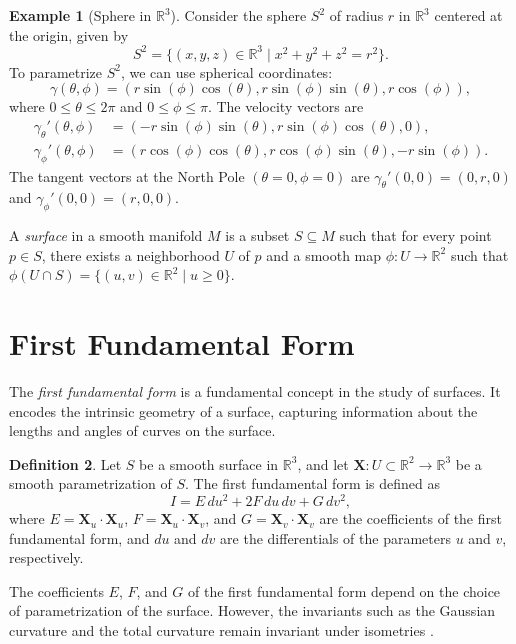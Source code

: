 \documentclass{article}
\theoremstyle{definition}
\newtheorem{definition}{Definition}[section]
\newtheorem{example}[definition]{Example}
\numberwithin{equation}{section}
\begin{document}
\begin{example}[Sphere in $\mathbb{R}^3$]
Consider the sphere $S^2$ of radius $r$ in $\mathbb{R}^3$ centered at the origin, given by
\[S^2 = \{(x, y, z) \in \mathbb{R}^3 \mid x^2 + y^2 + z^2 = r^2\}.\]
To parametrize $S^2$, we can use spherical coordinates:
\[\gamma(\theta, \phi) = (r\sin(\phi)\cos(\theta), r\sin(\phi)\sin(\theta), r\cos(\phi)),\]
where $0 \leq \theta \leq 2\pi$ and $0 \leq \phi \leq \pi$. The velocity vectors are
\begin{align}
\gamma_{\theta}'(\theta, \phi) &= (-r\sin(\phi)\sin(\theta), r\sin(\phi)\cos(\theta), 0), \label{eq:sphere_theta}\\
\gamma_{\phi}'(\theta, \phi) &= (r\cos(\phi)\cos(\theta), r\cos(\phi)\sin(\theta), -r\sin(\phi)). \label{eq:sphere_phi}
\end{align}
The tangent vectors at the North Pole $(\theta = 0, \phi = 0)$ are $\gamma_{\theta}'(0, 0) = (0, r, 0)$ and $\gamma_{\phi}'(0, 0) = (r, 0, 0)$.
\end{example}

A \textit{surface} in a smooth manifold $M$ is a subset $S \subseteq M$ such that for every point $p \in S$, there exists a neighborhood $U$ of $p$ and a smooth map $\phi: U \to \mathbb{R}^2$ such that $\phi(U \cap S) = \{(u, v) \in \mathbb{R}^2 \mid u \geq 0\}$.

\section{First Fundamental Form}
The \textit{first fundamental form} is a fundamental concept in the study of surfaces. It encodes the intrinsic geometry of a surface, capturing information about the lengths and angles of curves on the surface.

\begin{definition}
Let $S$ be a smooth surface in $\mathbb{R}^3$, and let $\mathbf{X}: U \subset \mathbb{R}^2 \to \mathbb{R}^3$ be a smooth parametrization of $S$. The first fundamental form is defined as
\[I = E\,du^2 + 2F\,du\,dv + G\,dv^2,\]
where $E = \mathbf{X}_u \cdot \mathbf{X}_u$, $F = \mathbf{X}_u \cdot \mathbf{X}_v$, and $G = \mathbf{X}_v \cdot \mathbf{X}_v$ are the coefficients of the first fundamental form, and $du$ and $dv$ are the differentials of the parameters $u$ and $v$, respectively.
\end{definition}

The coefficients $E$, $F$, and $G$ of the first fundamental form depend on the choice of parametrization of the surface. However, the invariants such as the Gaussian curvature and the total curvature remain invariant under isometries \cite{do-carmo}.
\end{document}
